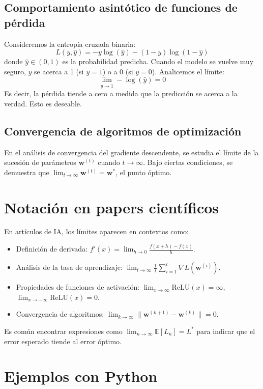 \documentclass[12pt,a4paper,openany,oneside]{book}
\begin{document}
\subsection{Comportamiento asintótico de funciones de pérdida}
Consideremos la entropía cruzada binaria:
\[
L(y, \hat{y}) = -y \log(\hat{y}) - (1-y) \log(1-\hat{y})
\]
donde $\hat{y} \in (0,1)$ es la probabilidad predicha. Cuando el modelo se vuelve muy seguro, $\hat{y}$ se acerca a 1 (si $y=1$) o a 0 (si $y=0$). Analicemos el límite:
\[
\lim_{\hat{y} \to 1} -\log(\hat{y}) = 0
\]
Es decir, la pérdida tiende a cero a medida que la predicción se acerca a la verdad. Esto es deseable.

\subsection{Convergencia de algoritmos de optimización}
En el análisis de convergencia del gradiente descendente, se estudia el límite de la sucesión de parámetros $\mathbf{w}^{(t)}$ cuando $t \to \infty$. Bajo ciertas condiciones, se demuestra que $\lim_{t \to \infty} \mathbf{w}^{(t)} = \mathbf{w}^*$, el punto óptimo.

\section{Notación en papers científicos}
En artículos de IA, los límites aparecen en contextos como:
\begin{itemize}
    \item Definición de derivada: $f'(x) = \lim_{h \to 0} \frac{f(x+h)-f(x)}{h}$.
    \item Análisis de la tasa de aprendizaje: $\lim_{t \to \infty} \frac{1}{t} \sum_{i=1}^t \nabla L(\mathbf{w}^{(i)})$.
    \item Propiedades de funciones de activación: $\lim_{x \to \infty} \text{ReLU}(x) = \infty$, $\lim_{x \to -\infty} \text{ReLU}(x) = 0$.
    \item Convergencia de algoritmos: $\lim_{k \to \infty} \| \mathbf{w}^{(k+1)} - \mathbf{w}^{(k)} \| = 0$.
\end{itemize}

Es común encontrar expresiones como $\lim_{n \to \infty} \mathbb{E}[L_n] = L^*$ para indicar que el error esperado tiende al error óptimo.

\section{Ejemplos con Python}
\end{document}
